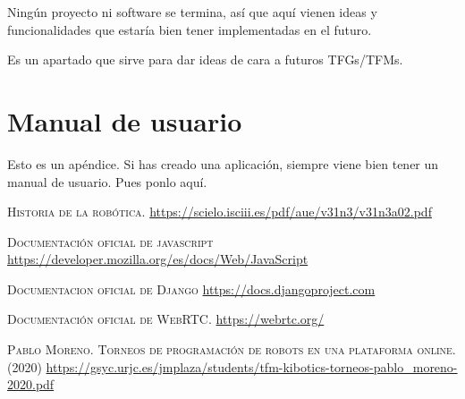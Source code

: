 \documentclass[a4paper, 12pt]{book}
\begin{document}
Ningún proyecto ni software se termina, así que aquí vienen ideas y funcionalidades que estaría bien tener implementadas en el futuro.

Es un apartado que sirve para dar ideas de cara a futuros TFGs/TFMs.



\cleardoublepage
\appendix
\chapter{Manual de usuario}
\label{app:manual}

Esto es un apéndice.
Si has creado una aplicación, siempre viene bien tener un manual de usuario.
Pues ponlo aquí.


\cleardoublepage

\begin{thebibliography}{X}
	 \textsc{Historia de la robótica.}
	\url{https://scielo.isciii.es/pdf/aue/v31n3/v31n3a02.pdf}
	
	 \textsc{Documentación oficial de javascript}
	\url{https://developer.mozilla.org/es/docs/Web/JavaScript}	
	
	 \textsc{Documentacion oficial de Django}
	\url{https://docs.djangoproject.com}	
	
	 \textsc{Documentación oficial de WebRTC.}
	\url{https://webrtc.org/}
	
	
	 \textsc{Pablo Moreno. Torneos de programación de robots
en una plataforma online. (2020)}
	\url{https://gsyc.urjc.es/jmplaza/students/tfm-kibotics-torneos-pablo_moreno-2020.pdf}
	
	\bibitem{} \textsc{}
	\url{}
\end{thebibliography}
\end{document}
